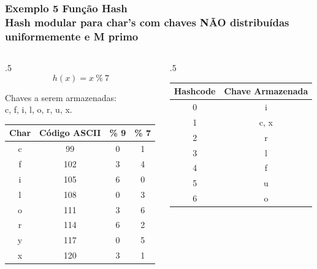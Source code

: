 \documentclass{beamer}
\begin{document}
\begin{frame}
  \frametitle{Exemplo 5 Função Hash\\\small{Hash modular para char's com chaves NÃO distribuídas uniformemente e M primo}}

  \begin{columns}
    \begin{column}{.5\textwidth}
      \[ h(x) = x~\%~7 \]

      \center Chaves a serem armazenadas:\\c, f, i, l, o, r, u, x.
      \begin{table}[]
        \centering
        \small
        \begin{tabular}{@{}cccc@{}}
          \toprule
          Char & Código ASCII & \% 9 & \% 7 \\ \midrule
          c    & 99           & 0    & 1    \\
          f    & 102          & 3    & 4    \\
          i    & 105          & 6    & 0    \\
          l    & 108          & 0    & 3    \\
          o    & 111          & 3    & 6    \\
          r    & 114          & 6    & 2    \\
          y    & 117          & 0    & 5    \\
          x    & 120          & 3    & 1    \\ \bottomrule
        \end{tabular}
      \end{table}  
    \end{column}
    \begin{column}{.5\textwidth}

      \begin{table}[]
        \centering
        \small
        \begin{tabular}{@{}cc@{}}
          \toprule
          Hashcode & Chave Armazenada \\ \midrule
          0        & i                \\
          1        & c, x             \\
          2        & r                \\
          3        & l                \\
          4        & f                \\
          5        & u                \\
          6        & o                \\ \bottomrule
        \end{tabular}
      \end{table}  
    \end{column}
  \end{columns}
\end{frame}
\end{document}
